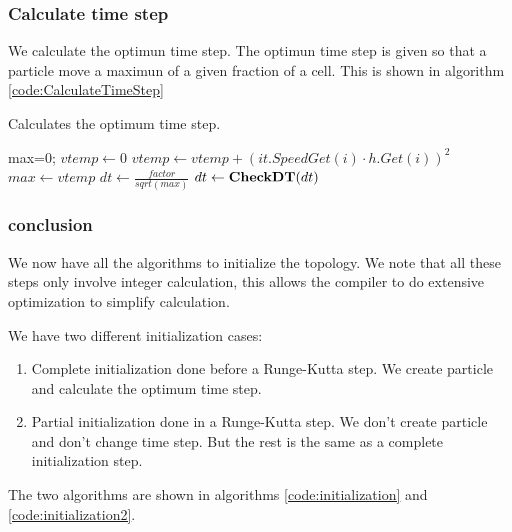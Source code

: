 \subsubsection{Calculate time step}

We calculate the optimun time step.
The optimun time step is given so that a particle move a maximun of a given fraction of a cell.
This is shown in algorithm \ref{code:CalculateTimeStep}
\begin{algorithm}
\caption{Calculates the optimum time step.}
\label{code:CalculateTimeStep}
\begin{algorithmic}[1]
max=0;
				\State $vtemp\gets 0$
					\State $vtemp\gets vtemp+(it.SpeedGet(i)\cdot h.Get(i))^2$
				\EndFor
					\State $max \gets vtemp$
				\EndIf
			\EndIf
	\EndFor
        \State $dt \gets \frac{factor}{sqrt(max)}$ 
	\State $dt \gets \mathop{\textbf{CheckDT}}(dt)$ 
\EndProcedure
\end{algorithmic}
\end{algorithm}

\subsubsection{conclusion}

We now have all the algorithms to initialize the topology.
We note that all these steps only involve integer calculation, this allows the compiler to do extensive optimization
to simplify calculation.

We have two different initialization cases:
\begin{enumerate}
 \item Complete initialization done before a Runge-Kutta step. We create particle and calculate the optimum time step.
 \item Partial initialization done in a Runge-Kutta step. We don't create particle and don't change time step.
 But the rest is the same as a complete initialization step.
\end{enumerate}
The two algorithms are shown in algorithms \ref{code:initialization} and \ref{code:initialization2}.

